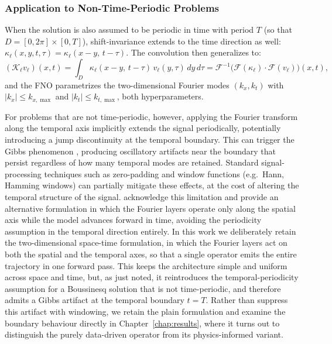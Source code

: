 \subsubsection{Application to Non-Time-Periodic Problems}
\label{subsubsec:fno_time}

When the solution is also assumed to be periodic in time with period $T$ (so that $D = [0, 2\pi] \times [0, T]$), shift-invariance extends to the time direction as well: $\kappa_\ell(x, y, t, \tau) = \kappa_\ell(x - y,\, t - \tau)$. The convolution then generalizes to:
\begin{equation}\label{eq:fno_spacetime}
    (\mathcal{K}_\ell v_\ell)(x,t)
    = \int_{D} \kappa_\ell(x-y,\,t-\tau)\,v_\ell(y,\tau)\,dy\,d\tau
    = \mathcal{F}^{-1}\!\Big(\mathcal{F}(\kappa_\ell)\cdot\mathcal{F}(v_\ell)\Big)(x,t),
\end{equation}
and the FNO parametrizes the two-dimensional Fourier modes $(k_x, k_t)$ with $|k_x| \le k_{x,\max}$ and $|k_t| \le k_{t,\max}$, both hyperparameters.

For problems that are not time-periodic, however, applying the Fourier transform along the temporal axis implicitly extends the signal periodically, potentially introducing a jump discontinuity at the temporal boundary. This can trigger the Gibbs phenomenon \parencite{gibbs1899}, producing oscillatory artifacts near the boundary that persist regardless of how many temporal modes are retained. Standard signal-processing techniques such as zero-padding and window functions (e.g.\ Hann, Hamming windows) can partially mitigate these effects, at the cost of altering the temporal structure of the signal. \textcite{li2020fourier} acknowledge this limitation and provide an alternative formulation in which the Fourier layers operate only along the spatial axis while the model advances forward in time, avoiding the periodicity assumption in the temporal direction entirely. In this work we deliberately retain the two-dimensional space-time formulation, in which the Fourier layers act on both the spatial and the temporal axes, so that a single operator emits the entire trajectory in one forward pass. This keeps the architecture simple and uniform across space and time, but, as just noted, it reintroduces the temporal-periodicity assumption for a Boussinesq solution that is not time-periodic, and therefore admits a Gibbs artifact at the temporal boundary $t = T$. Rather than suppress this artifact with windowing, we retain the plain formulation and examine the boundary behaviour directly in Chapter~\ref{chap:results}, where it turns out to distinguish the purely data-driven operator from its physics-informed variant.

